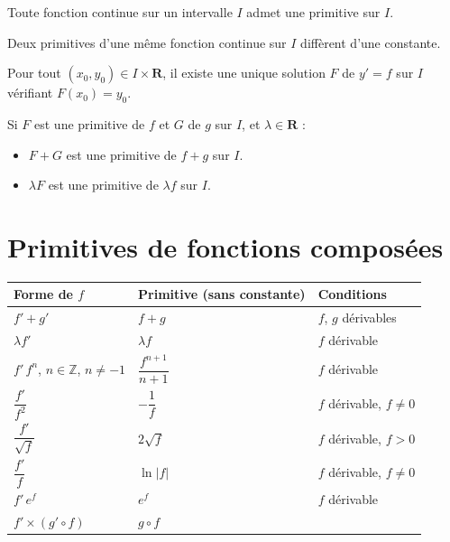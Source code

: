 \documentclass[11pt,a4paper,openany]{book}
\theoremstyle{definition}
\begin{document}
    \begin{Théorème}
        Toute fonction continue sur un intervalle $I$ admet une primitive sur $I$.
    \end{Théorème}

    \begin{Propriété}
        Deux primitives d'une même fonction continue sur $I$ diffèrent d'une constante.
    \end{Propriété}

    \begin{Propriété}
        Pour tout $(x_0,y_0)\in I\times\mathbf{R}$, il existe une unique solution $F$ de
        $y'=f$ sur $I$ vérifiant $F(x_0)=y_0$.
    \end{Propriété}

    \begin{Propriété}
        Si $F$ est une primitive de $f$ et $G$ de $g$ sur $I$, et $\lambda\in\mathbf{R}$ :
        \begin{itemize}
            \item $F+G$ est une primitive de $f+g$ sur $I$.
            \item $\lambda F$ est une primitive de $\lambda f$ sur $I$.
        \end{itemize}
    \end{Propriété}

    \section{Primitives de fonctions composées}
    \renewcommand{\arraystretch}{2.5}
    \begin{tabular}{|m{5cm}|m{4cm}|m{7cm}|}
        \hline
        Forme de $f$ & Primitive (sans constante) & Conditions \\
        \hline
        $f'+g'$ & $f+g$ & $f$, $g$ dérivables \\
        \hline
        $\lambda f'$ & $\lambda f$ & $f$ dérivable \\
        \hline
        $f'\,f^n$, $n\in\mathbb{Z}$, $n\neq-1$ & $\dfrac{f^{n+1}}{n+1}$ & $f$ dérivable \\
        \hline
        $\dfrac{f'}{f^2}$ & $-\dfrac{1}{f}$ & $f$ dérivable, $f\neq 0$ \\
        \hline
        $\dfrac{f'}{\sqrt{f}}$ & $2\sqrt{f}$ & $f$ dérivable, $f>0$ \\
        \hline
        $\dfrac{f'}{f}$ & $\ln|f|$ & $f$ dérivable, $f\neq 0$ \\
        \hline
        $f'\,e^f$ & $e^f$ & $f$ dérivable \\
        \hline
        $f'\times(g'\circ f)$ & $g\circ f$ & \\
        \hline
    \end{tabular}
\end{document}
